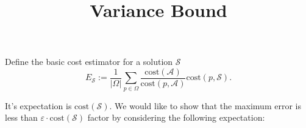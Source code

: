 \documentclass{article}
\newcommand{\cost}{\text{cost}}
\newcommand{\calS}{\mathcal{S}}
\newcommand{\greedy}{\mathcal{A}}
\begin{document}
%
\newcommand\relatedversion{}
\renewcommand\relatedversion{\thanks{The full version of the paper can be accessed at \protect\url{https://arxiv.org/abs/1902.09310}}} %



\title{\Large Variance Bound}
\author{}


\date{}

\maketitle







\begin{abstract} \small\baselineskip=9pt \end{abstract}

Define the basic cost estimator for a solution $\calS$
$$ E_{\calS}:= \frac{1}{|\Omega|}\sum_{p\in \Omega} \frac{\cost(\greedy)}{\cost(p,\greedy)}\cost(p,\calS).$$

It's expectation is $\cost(\calS)$. We would like to show that the maximum error is less than $\varepsilon\cdot \cost(\calS)$ factor by considering the following expectation:
\end{document}

